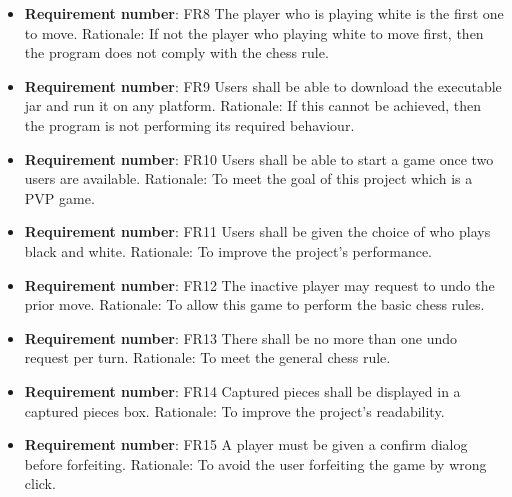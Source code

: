 \documentclass[12pt, titlepage]{article}
\begin{document}
\begin{itemize}
\item \textbf{Requirement number}: FR8\newline
The player who is playing white is the first one to move.\newline
Rationale: If not the player who playing white to move first, then the program does not comply with the chess rule.
 
\item \textbf{Requirement number}: FR9\newline
Users shall be able to download the executable jar and run it on any platform.\newline
Rationale: If this cannot be achieved, then the program is not performing its required behaviour.
 
\item \textbf{Requirement number}: FR10\newline
Users shall be able to start a game once two users are available. \newline
Rationale: To meet the goal of this project which is a PVP game.
 
\item \textbf{Requirement number}: FR11\newline
Users shall be given the choice of who plays black and white. \newline
Rationale: To improve the project’s performance.

\item \textbf{Requirement number}: FR12\newline
The inactive player may request to undo the prior move. \newline
Rationale: To allow this game to perform the basic chess rules.
 
\item \textbf{Requirement number}: FR13\newline
There shall be no more than one undo request per turn.\newline
Rationale: To meet the general chess rule.
 
\item \textbf{Requirement number}: FR14\newline
Captured pieces shall be displayed in a captured pieces box. \newline
Rationale: To improve the project’s readability.
 
\item \textbf{Requirement number}: FR15\newline
A player must be given a confirm dialog before forfeiting. \newline
Rationale: To avoid the user forfeiting the game by wrong click.
 

\end{itemize}
\end{document}
